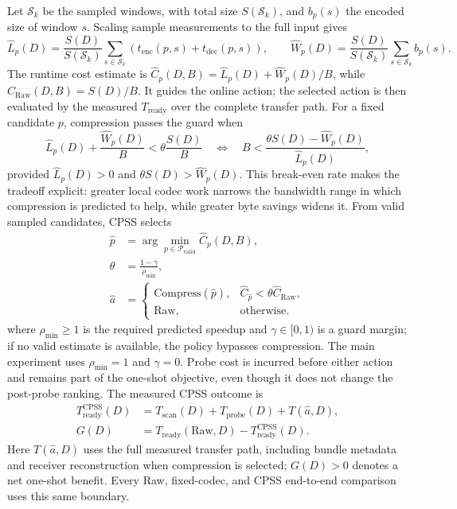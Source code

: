 \documentclass[smallabstract,smallcaptions]{dccpaper}
\begin{document}
Let $\mathcal{S}_k$ be the sampled windows, with total size $S(\mathcal{S}_k)$, and $b_p(s)$ the encoded size of window $s$. Scaling sample measurements to the full input gives
\begin{equation}
\widehat{L}_p(D)=\frac{S(D)}{S(\mathcal{S}_k)}\sum_{s\in\mathcal{S}_k}\left(t_{\mathrm{enc}}(p,s)+t_{\mathrm{dec}}(p,s)\right),\qquad
\widehat{W}_p(D)=\frac{S(D)}{S(\mathcal{S}_k)}\sum_{s\in\mathcal{S}_k}b_p(s).
\end{equation}
The runtime cost estimate is $\widehat{C}_p(D,B)=\widehat{L}_p(D)+\widehat{W}_p(D)/B$, while $\widehat{C}_{\mathrm{Raw}}(D,B)=S(D)/B$. It guides the online action; the selected action is then evaluated by the measured $T_{\mathrm{ready}}$ over the complete transfer path. For a fixed candidate $p$, compression passes the guard when
\begin{equation}
\widehat{L}_p(D)+\frac{\widehat{W}_p(D)}{B}<\theta\frac{S(D)}{B}
\quad\Longleftrightarrow\quad
B<\frac{\theta S(D)-\widehat{W}_p(D)}{\widehat{L}_p(D)},
\label{eq:break-even}
\end{equation}
provided $\widehat{L}_p(D)>0$ and $\theta S(D)>\widehat{W}_p(D)$. This break-even rate makes the tradeoff explicit: greater local codec work narrows the bandwidth range in which compression is predicted to help, while greater byte savings widens it. From valid sampled candidates, CPSS selects
\begin{equation}
\begin{aligned}
\hat p&=\arg\min_{p\in\mathcal{P}_{\mathrm{valid}}}\widehat{C}_p(D,B),\\
\theta&=\frac{1-\gamma}{\rho_{\min}},\\
\hat a&=\begin{cases}
\mathrm{Compress}(\hat p), & \widehat{C}_{\hat p}<\theta\widehat{C}_{\mathrm{Raw}},\\
\mathrm{Raw}, & \text{otherwise}.
\end{cases}
\end{aligned}
\end{equation}
where $\rho_{\min}\ge 1$ is the required predicted speedup and $\gamma\in[0,1)$ is a guard margin; if no valid estimate is available, the policy bypasses compression. The main experiment uses $\rho_{\min}=1$ and $\gamma=0$. Probe cost is incurred before either action and remains part of the one-shot objective, even though it does not change the post-probe ranking. The measured CPSS outcome is
\begin{equation}
\begin{aligned}
T_{\mathrm{ready}}^{\mathrm{CPSS}}(D)
 &=T_{\mathrm{scan}}(D)+T_{\mathrm{probe}}(D)+T(\hat a,D),\\
G(D)&=T_{\mathrm{ready}}(\mathrm{Raw},D)-T_{\mathrm{ready}}^{\mathrm{CPSS}}(D).
\end{aligned}
\end{equation}
Here $T(\hat a,D)$ uses the full measured transfer path, including bundle metadata and receiver reconstruction when compression is selected; $G(D)>0$ denotes a net one-shot benefit. Every Raw, fixed-codec, and CPSS end-to-end comparison uses this same boundary.
\end{document}
